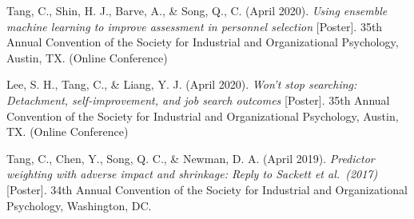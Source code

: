 \documentclass[
  20,
]{article}
\begin{document}
Tang, C., Shin, H. J., Barve, A., \& Song, Q., C. (April 2020).
\emph{Using ensemble machine learning to improve assessment in personnel
selection} {[}Poster{]}. 35th Annual Convention of the Society for
Industrial and Organizational Psychology, Austin, TX. (Online
Conference)

Lee, S. H., Tang, C., \& Liang, Y. J. (April 2020). \emph{Won't stop
searching: Detachment, self-improvement, and job search outcomes}
{[}Poster{]}. 35th Annual Convention of the Society for Industrial and
Organizational Psychology, Austin, TX. (Online Conference)

Tang, C., Chen, Y., Song, Q. C., \& Newman, D. A. (April 2019).
\emph{Predictor weighting with adverse impact and shrinkage: Reply to
Sackett et al.~(2017)} {[}Poster{]}. 34th Annual Convention of the
Society for Industrial and Organizational Psychology, Washington, DC.
\end{document}
